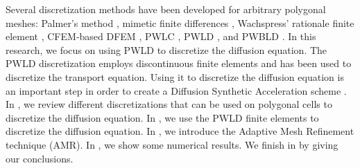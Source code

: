 Several discretization methods have been developed for arbitrary polygonal
meshes: Palmer's method \cite{Palmer2001}, mimetic finite differences
\cite{Lipnikov2004,Hyman2002,Kuznetsov2004,Brezzi2005},
Wachspress' rationale finite element \cite{Wachspress1975},
CFEM-based DFEM \cite{Warsa2008}, PWLC \cite{Bailey2008a}, PWLD 
\cite{Stone2003,Bailey2008,Bailey2008a}, and PWBLD \cite{Bailey2011}. In this
research, we focus on using PWLD to discretize the diffusion equation. The
PWLD discretization employs discontinuous finite elements and has been used to
discretize the transport equation. Using it to discretize the diffusion
equation is an important step in order to create a Diffusion Synthetic
Acceleration scheme \cite{Adams2002,Wang2010}.
In , we review different discretizations that can be used on
polygonal cells to discretize the diffusion equation. In , we
use the PWLD finite elements to discretize the diffusion
equation. In , we introduce the Adaptive Mesh Refinement
technique (AMR). In , we show some numerical results. We finish
in  by giving our conclusions.
